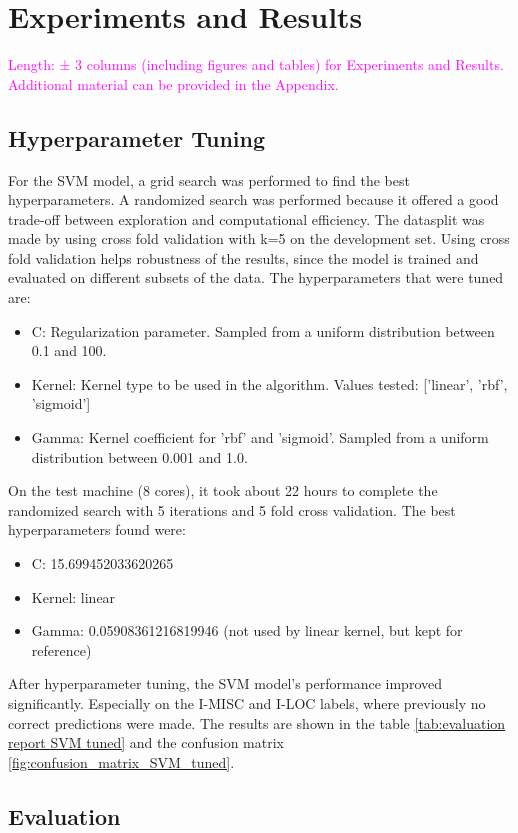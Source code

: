 \documentclass[11pt]{article}
\begin{document}
\section{Experiments and Results}

\textcolor{magenta}{Length: ± 3 columns (including figures and tables) for Experiments and Results. Additional material can be provided in the Appendix.}
\subsection{Hyperparameter Tuning}
For the SVM model, a grid search was performed to find the best hyperparameters.
A randomized search was performed because it offered a good trade-off between exploration and computational efficiency.
The datasplit was made by using cross fold validation with k=5 on the development set.
Using cross fold validation helps robustness of the results, since the model is trained and evaluated on different subsets of the data.
The hyperparameters that were tuned are:
\begin{itemize}
    \item C: Regularization parameter. Sampled from a uniform distribution between 0.1 and 100.
    \item Kernel: Kernel type to be used in the algorithm. Values tested: ['linear', 'rbf', 'sigmoid']
    \item Gamma: Kernel coefficient for 'rbf' and 'sigmoid'. Sampled from a uniform distribution between 0.001 and 1.0.
\end{itemize}
On the test machine (8 cores), it took about 22 hours to complete the randomized search with 5 iterations and 5 fold cross validation.
The best hyperparameters found were:
\begin{itemize}
    \item C: 15.699452033620265
    \item Kernel: linear
    \item Gamma: 0.05908361216819946 (not used by linear kernel, but kept for reference)
\end{itemize}
After hyperparameter tuning, the SVM model's performance improved significantly. Especially on the I-MISC and I-LOC labels, where previously no correct predictions were made.
The results are shown in the table \ref{tab:evaluation report SVM tuned} and the confusion matrix \ref{fig:confusion_matrix_SVM_tuned}.
\subsection{Evaluation}
\end{document}
